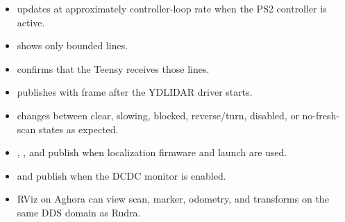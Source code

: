 \begin{itemize}
  \item {} updates at approximately controller-loop rate when the PS2 controller is active.
  \item {} shows only bounded  lines.
  \item {} confirms that the Teensy receives those lines.
  \item {} publishes with frame  after the YDLIDAR driver starts.
  \item {} changes between clear, slowing, blocked, reverse/turn, disabled, or no-fresh-scan states as expected.
  \item {}, , and  publish when localization firmware and launch are used.
  \item {} and  publish when the DCDC monitor is enabled.
  \item RViz on Aghora can view scan, marker, odometry, and transforms on the same DDS domain as Rudra.
\end{itemize}
